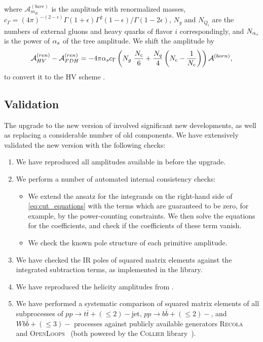 where $\mathcal{A}^{(bare)}_{m_R}$ is the amplitude with renormalized masses,
$\displaystyle c_\Gamma={(4\pi)^{-(2-\epsilon)}{\Gamma(1+\epsilon)\Gamma^2(1-\epsilon)}/\Gamma(1-2\epsilon)}$,
$N_g$ and $N_{Q_i}$ are the numbers of external gluons and heavy quarks of flavor $i$ correspondingly,
and $N_{\alpha_s}$ is the power of $\alpha_s$ of the tree amplitude.
We shift  the amplitude by
\begin{equation}
  \mathcal{A}^{(ren)}_{HV} - \mathcal{A}^{(ren)}_{FDH} = -4\pi \alpha_s c_\Gamma\left(N_{g}~\frac{N_\mathrm{c}}{6} + \frac{N_q}{4}\left(N_\mathrm{c} -\frac{1}{N_\mathrm{c}}\right)\right)\mathcal{A}^{(born)},
  \label{schemeshift}
\end{equation}
to convert it to the HV scheme \cite{Signer:2008va}.



\subsection{Validation}

The upgrade to the new version of \BlackHat{} involved significant new developments,
as well as replacing a considerable number of old components.
We have extensively validated the new version with the following checks:
\begin{enumerate}
  \item We have reproduced all amplitudes available in \BlackHat{} before the upgrade.
  \item We perform a number of automated internal consistency checks:
    \begin{itemize}
      \item We extend the ansatz for the integrands on the right-hand side of \cref{eq:cut_equations} with the terms which are guaranteed to be zero, for example, by the power-counting constraints.
        We then solve the equations for the coefficients, and check if the coefficients of these term vanish.
      \item We check the known pole structure \cite{Catani:2000ef} of each primitive amplitude.
    \end{itemize}
  \item We have checked the IR poles of squared matrix elements against the integrated subtraction terms,
    as implemented in the \SHERPA{} library.
  \item We have reproduced the helicity amplitudes from \cite{Ellis:2008ir}.
  \item We have performed a systematic comparison of squared matrix elements 
    of all subprocesses of $pp\rightarrow t\bar t+(\leq 2)-$jet, $pp\rightarrow b\bar b+(\leq 2)-$, and
$Wb\bar b+(\leq3)-$ processes against publicly available generators 
\textsc{Recola}~\cite{Actis:2016mpe} and \textsc{OpenLoops}~\cite{Cascioli:2011va} 
(both powered by the \textsc{Collier} library~\cite{Denner:2016kdg}).
\end{enumerate}

